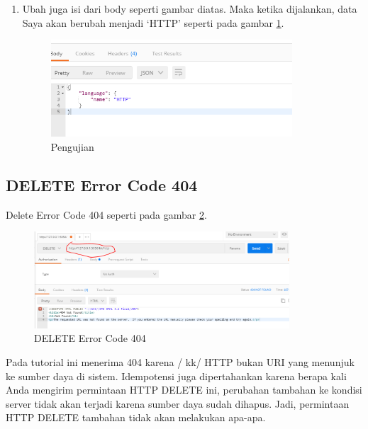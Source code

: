\begin{enumerate}
\item Ubah juga isi dari body seperti gambar diatas. Maka ketika dijalankan, data Saya akan berubah menjadi ‘HTTP’ seperti pada gambar \ref{fig:pu}.
\begin{figure}[!htbp]
	\centerline{\includegraphics[width=0.85\textwidth]{figures/11/pu.PNG}}
	\caption{Pengujian}
	\label{fig:pu}
\end{figure}
\end{enumerate}

\subsection{DELETE Error Code 404} 
Delete Error Code 404 seperti pada gambar \ref{fig:dec}.
\begin{figure}[!htbp]
	\centerline{\includegraphics[width=0.85\textwidth]{figures/11/dec.PNG}}
	\caption{DELETE Error Code 404}
	\label{fig:dec}
\end{figure}

Pada tutorial ini menerima 404 karena / kk/ HTTP bukan URI yang menunjuk ke sumber daya di sistem. Idempotensi juga dipertahankan karena berapa kali Anda mengirim permintaan HTTP DELETE ini, perubahan tambahan ke kondisi server tidak akan terjadi karena sumber daya sudah dihapus. Jadi, permintaan HTTP DELETE tambahan tidak akan melakukan apa-apa.

